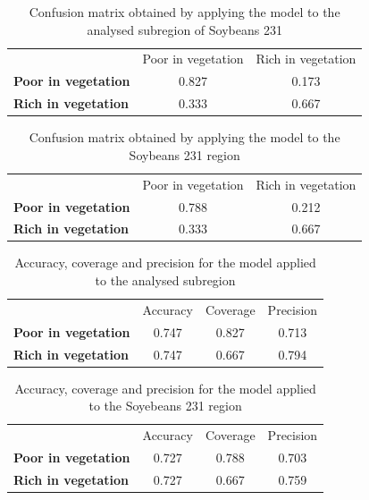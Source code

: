 \documentclass[12pt]{article}
\begin{document}
\begin{table}[hbt]
  \centering
  \caption{Confusion matrix obtained by applying the model to the analysed subregion of Soybeans 231}\label{tab:subregion_sb231_confusion_matrix}
  \begin{tabular}{lcc}
    \toprule
    & Poor in vegetation & Rich in vegetation\\
    \cmidrule{2-3}
    \textbf{Poor in vegetation} & 0.827 & 0.173\\
    \textbf{Rich in vegetation} & 0.333 & 0.667\\
    \bottomrule
  \end{tabular}
\end{table}

\begin{table}[hbt]
  \centering
  \caption{Confusion matrix obtained by applying the model to the Soybeans 231 region}\label{tab:sb231_confusion_matrix}
  \begin{tabular}{lcc}
    \toprule
    & Poor in vegetation & Rich in vegetation\\
    \cmidrule{2-3}
    \textbf{Poor in vegetation} & 0.788 & 0.212\\
    \textbf{Rich in vegetation} & 0.333 & 0.667\\
    \bottomrule
  \end{tabular}
\end{table}

\begin{table}[hbt]
  \centering
  \caption{Accuracy, coverage and precision for the model applied to the analysed subregion}\label{tab:subregion_sb231_analysis}
  \begin{tabular}{lccc}
    \toprule
    & Accuracy & Coverage & Precision\\
    \cmidrule{2-4}
    \textbf{Poor in vegetation} & 0.747 & 0.827 & 0.713\\
    \textbf{Rich in vegetation} & 0.747 & 0.667 & 0.794\\
    \bottomrule
  \end{tabular}
\end{table}

\begin{table}[hbt]
  \centering
  \caption{Accuracy, coverage and precision for the model applied to the Soyebeans 231 region}\label{tab:sb231_analysis}
  \begin{tabular}{lccc}
    \toprule
    & Accuracy & Coverage & Precision\\
    \cmidrule{2-4}
    \textbf{Poor in vegetation} & 0.727 & 0.788 & 0.703\\
    \textbf{Rich in vegetation} & 0.727 & 0.667 & 0.759\\
    \bottomrule
  \end{tabular}
\end{table}

\end{document}
